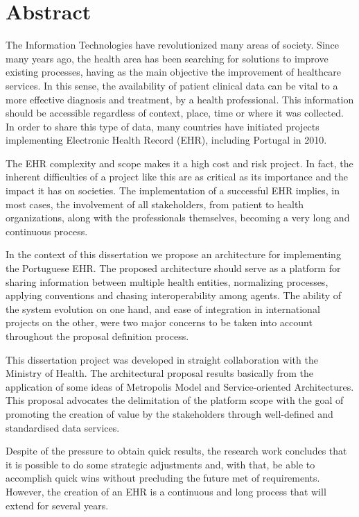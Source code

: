 \chapter*{Abstract}

The Information Technologies have revolutionized many areas of society. Since many years ago, the health area has been searching for solutions to improve existing processes, having as the main objective the improvement of healthcare services. In this sense, the availability of patient clinical data can be vital to a more effective diagnosis and treatment, by a health professional. This information should be accessible regardless of context, place, time or where it was collected. In order to share this type of data, many countries have initiated projects implementing Electronic Health Record (EHR), including Portugal in 2010.

The EHR complexity and scope makes it a high cost and risk project. In fact, the inherent difficulties of a project like this are as critical as its importance and the impact it has on societies. The implementation of a successful EHR implies, in most cases, the involvement of all stakeholders, from patient to health organizations, along with the professionals themselves, becoming a very long and continuous process.

In the context of this dissertation we propose an architecture for implementing the Portuguese EHR. The proposed architecture should serve as a platform for sharing information between multiple health entities, normalizing processes, applying conventions and chasing interoperability among agents. The ability of the system evolution on one hand, and ease of integration in international projects on the other, were two major concerns to be taken into account throughout the proposal definition process.

This dissertation project was developed in straight collaboration with the Ministry of Health. The architectural proposal results basically from the application of some ideas of Metropolis Model and Service-oriented Architectures. This proposal advocates the delimitation of the platform scope with the goal of promoting the creation of value by the stakeholders through well-defined and standardised data services.

Despite of the pressure to obtain quick results, the research work concludes that it is possible to do some strategic adjustments and, with that, be able to accomplish quick wins without precluding the future met of requirements. However, the creation of an EHR is a continuous and long process that will extend for several years.

